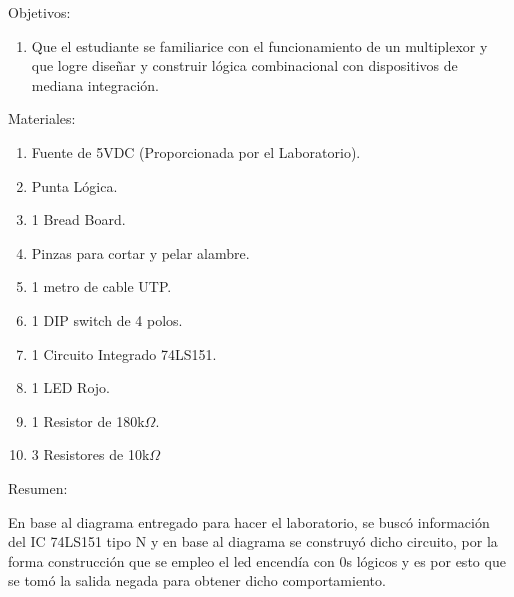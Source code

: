 \documentclass[11pt, letterpaper]{article}
\begin{document}
 
		
	\begin{block}{Objetivos:}
		\begin{enumerate}
			\item Que el estudiante se familiarice con el funcionamiento de un multiplexor y que logre
			diseñar y construir lógica combinacional con dispositivos de mediana integración.
		\end{enumerate}
	\end{block}

	\begin{block}{Materiales:}
		\begin{enumerate}
			\item Fuente de 5VDC (Proporcionada por el Laboratorio).
			\item Punta Lógica.
			\item 1 Bread Board.
			\item Pinzas para cortar y pelar alambre.
			\item 1 metro de cable UTP.
			\item 1 DIP switch de 4 polos.
			\item 1 Circuito Integrado 74LS151.
			\item 1 LED Rojo.
			\item 1 Resistor de 180k$\Omega$.
			\item 3 Resistores de 10k$\Omega$
		\end{enumerate}
	\end{block}

	\begin{block}{Resumen:\\}
		
		En base al diagrama entregado para hacer el laboratorio, se buscó información del IC 74LS151 tipo N y en base al diagrama se construyó dicho circuito, por la forma construcción que se empleo el led encendía con 0s lógicos y es por esto que se tomó la salida negada para obtener dicho comportamiento.
	\end{block}
\end{document}
